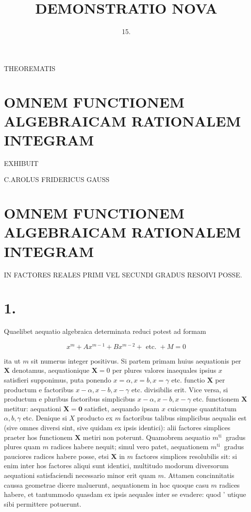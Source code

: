 \documentclass[twoside,12pt, showframe]{memoir}
\begin{document}
\setlength{\abovedisplayskip}{0.33\baselineskip plus .25\baselineskip minus .25\baselineskip}
\setlength{\belowdisplayskip}{0.33\baselineskip plus .25\baselineskip minus .25\baselineskip}

\title{DEMONSTRATIO NOVA }


\author{15.}
\date{}


\maketitle
THEOREMATIS

\section*{OMNEM FUNCTIONEM ALGEBRAICAM RATIONALEM INTEGRAM}
EXHIBUIT

C.AROLUS FRIDERICUS GAUSS

\section*{OMNEM FUNCTIONEM ALGEBRAICAM RATIONALEM INTEGRAM }
IN FACTORES REALES PRIMI VEL SECUNDI GRADUS RESOIVI POSSE.

\section*{1.}
Quaelibet aequatio algebraica determinata reduci potest ad formam

\[
x^{m}+A x^{m-1}+B x^{m-2}+\text { etc. }+M=0
\]

ita ut \(m\) sit numerus integer positivus. Si partem primam huius aequationis per \(\boldsymbol{X}\) denotamus, aequationique \(\mathbf{X}=0\) per plures valores inaequales ipsius \(x\) satisfieri supponimus, puta ponendo \(x=\alpha, x=b, x=\gamma\) etc. functio \(\boldsymbol{X}\) per productum e factoribus \(x-\alpha, x-b, x-\gamma\) etc. divisibilis erit. Vice versa, si productum e pluribus factoribus simplicibus \(x-\alpha, x-b, x-\gamma\) etc. functionem \(\boldsymbol{X}\) metitur: aequationi \(\boldsymbol{X}=\mathbf{0}\) satisfiet, aequando ipsam \(x\) cuicunque quantitatum \(\alpha, b, \gamma\) etc. Denique si \(X\) producto ex \(m\) factoribus talibus simplicibus aequalis est (sive omnes diversi sint, sive quidam ex ipsis identici): alii factores simplices praeter hos functionem \(\boldsymbol{X}\) metiri non poterunt. Quamobrem aequatio \(m^{\text {ti }}\) gradus plures quam \(m\) radices habere nequit; simul vero patet, aequationem \(m^{\text {ti }}\) gradus pauciores radices habere posse, etsi \(\mathbf{X}\) in \(m\) factores simplices resolubilis sit: si enim inter hos factores aliqui sunt identici, multitudo modorum diversorum aequationi satisfaciendi necessario minor erit quam \(m\). Attamen concinnitatis caussa geometrae dicere maluerunt, aequationem in hoc quoque casu \(m\) radices habere, et tantummodo quasdam ex ipsis aequales inter se evadere: quod ' utique sibi permittere potuerunt.
\end{document}
